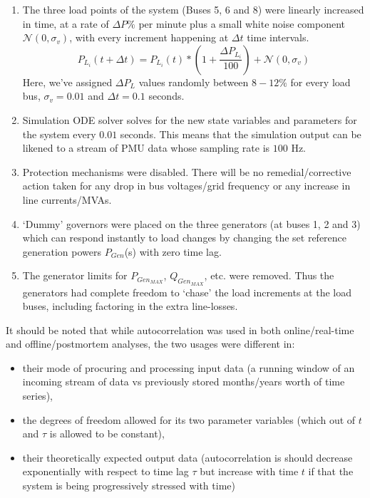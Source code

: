 \begin{enumerate}
	\item The three load points of the system (Buses 5, 6 and 8) were linearly increased in time, at a rate of $\Delta P \%$ per minute plus a small white noise component $\mathcal{N}(0, \sigma_v)$, with every increment happening at $\Delta t$ time intervals. 
	\begin{equation}
		P_{L_i}(t+\Delta t) = P_{L_i}(t)*\left(1+ \frac{\Delta P_{L_i}}{100}\right) + \mathcal{N}(0, \sigma_v)
	\end{equation} 
	Here, we've assigned $\Delta P_{L}$ values randomly between $8-12\%$ for every load bus, $\sigma_v = 0.01$ and $\Delta t = 0.1$ seconds.
	\item Simulation ODE solver solves for the new state variables and parameters for the system every $0.01$ seconds. This means that the simulation output can be likened to a stream of PMU data whose sampling rate is $100$ Hz.
	\item Protection mechanisms were disabled. There will be no remedial/corrective action taken for any drop in bus voltages/grid frequency or any increase in line currents/MVAs.
	\item `Dummy' governors were placed on the three generators (at buses 1, 2 and 3) which can respond instantly to load changes by changing the set reference generation powers $P_{Gen}$(s) with zero time lag.
	\item The generator limits for $P_{Gen_{MAX}}$, $Q_{Gen_{MAX}}$, etc. were removed. Thus the generators had complete freedom to `chase' the load increments at the load buses, including factoring in the extra line-losses.
\end{enumerate} 

It should be noted that while autocorrelation was used in both online/real-time and offline/postmortem analyses, the two usages were different in:

\begin{itemize}
	\item their mode of procuring and processing input data (a running window of an incoming stream of data vs previously stored months/years worth of time series),
	\item the degrees of freedom allowed for its two parameter variables (which out of $t$ and $\tau$ is allowed to be constant),
	\item their theoretically expected output data (autocorrelation is should decrease exponentially with respect to time lag $\tau$ but increase with time $t$ if that the system is being progressively stressed with time)
\end{itemize} 
 